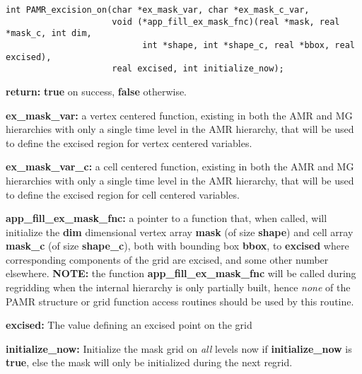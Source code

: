 \documentclass[aps,amssymb,unsortedaddress,nofootinbib]{revtex4}
\def\lsep{\itemsep 0.05in}
\begin{document}

\begin{verbatim}
int PAMR_excision_on(char *ex_mask_var, char *ex_mask_c_var,
                     void (*app_fill_ex_mask_fnc)(real *mask, real *mask_c, int dim, 
                           int *shape, int *shape_c, real *bbox, real excised),
                     real excised, int initialize_now);
\end{verbatim}
\begin{list}{}{\lsep}
\item {\bf return:} {\bf true} on success, {\bf false} otherwise.
\item {\bf *ex\_mask\_var:} a vertex centered function, existing in both the AMR and MG hierarchies
                            with only a single time level in the AMR hierarchy, that will
                            be used to define the excised region for vertex centered variables.
\item {\bf *ex\_mask\_var\_c:} a cell centered function, existing in both the AMR and MG hierarchies
                            with only a single time level in the AMR hierarchy, that will
                            be used to define the excised region for cell centered variables.
\item {\bf *app\_fill\_ex\_mask\_fnc:} a pointer to a function that, when called, will initialize
                            the {\bf dim} dimensional vertex array {\bf mask} (of size {\bf shape})
                            and cell array {\bf mask\_c} (of size {\bf shape\_c}),
                            both with bounding box {\bf bbox}, to {\bf excised} where corresponding components
                            of the grid are excised, and some other number elsewhere.
                            {\bf NOTE:} the function {\bf app\_fill\_ex\_mask\_fnc} 
                            will be called during regridding when
                            the internal hierarchy is only partially built, hence
                            {\em none} of the PAMR structure or grid function access routines 
                            should be used by this routine.
\item {\bf excised:}        The value defining an excised point on the grid
\item {\bf initialize\_now:} Initialize the mask grid on {\em all} levels now if {\bf initialize\_now}
                            is {\bf true}, else the mask will only be initialized during the next regrid.
\end{list}
\end{document}
